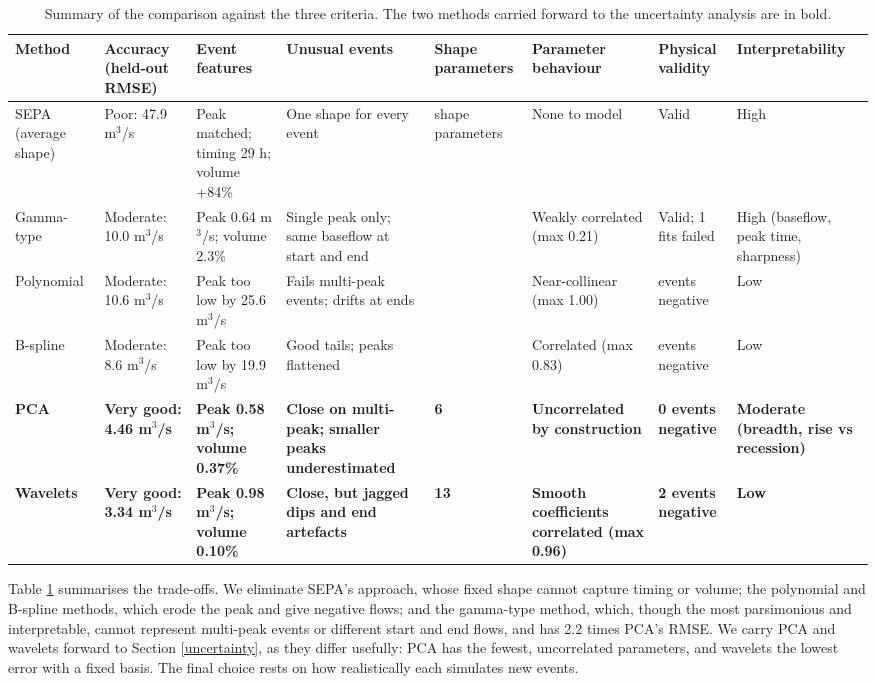 \documentclass[
  11pt,
  a4paper]{article}
\begin{document}
\begin{table}[!h]
\centering
\caption{\label{tab:cmp-synthesis}Summary of the comparison against the three criteria. The two methods carried forward to the uncertainty analysis are in bold.}
\centering
\fontsize{8}{10}\selectfont
\begin{tabular}[t]{>{\raggedright\arraybackslash}p{1.6cm}>{\raggedright\arraybackslash}p{1.5cm}>{\raggedright\arraybackslash}p{1.5cm}>{\raggedright\arraybackslash}p{1.5cm}>{\raggedright\arraybackslash}p{1.5cm}>{\raggedright\arraybackslash}p{1.5cm}>{\raggedright\arraybackslash}p{1.5cm}>{\raggedright\arraybackslash}p{1.5cm}}
\toprule
Method & Accuracy (held-out RMSE) & Event features & Unusual events & Shape parameters & Parameter behaviour & Physical validity & Interpretability\\
\midrule
SEPA (average shape) & Poor: 47.9 m$^3$/s & Peak matched; timing 29 h; volume +84\% & One shape for every event & 0 shape parameters & None to model & Valid & High\\
Gamma-type & Moderate: 10.0 m$^3$/s & Peak 0.64 m$^3$/s; volume 2.3\% & Single peak only; same baseflow at start and end & 3 & Weakly correlated (max 0.21) & Valid; 1 fits failed & High (baseflow, peak time, sharpness)\\
Polynomial & Moderate: 10.6 m$^3$/s & Peak too low by 25.6 m$^3$/s & Fails multi-peak events; drifts at ends & 8 & Near-collinear (max 1.00) & 15 events negative & Low\\
B-spline & Moderate: 8.6 m$^3$/s & Peak too low by 19.9 m$^3$/s & Good tails; peaks flattened & 9 & Correlated (max 0.83) & 15 events negative & Low\\
\textbf{PCA} & \textbf{Very good: 4.46 m$^3$/s} & \textbf{Peak 0.58 m$^3$/s; volume 0.37\%} & \textbf{Close on multi-peak; smaller peaks underestimated} & \textbf{6} & \textbf{Uncorrelated by construction} & \textbf{0 events negative} & \textbf{Moderate (breadth, rise vs recession)}\\
\addlinespace
\textbf{Wavelets} & \textbf{Very good: 3.34 m$^3$/s} & \textbf{Peak 0.98 m$^3$/s; volume 0.10\%} & \textbf{Close, but jagged dips and end artefacts} & \textbf{13} & \textbf{Smooth coefficients correlated (max 0.96)} & \textbf{2 events negative} & \textbf{Low}\\
\bottomrule
\end{tabular}
\end{table}

Table \ref{tab:cmp-synthesis} summarises the trade-offs. We eliminate SEPA's approach, whose fixed shape cannot capture timing or volume; the polynomial and B-spline methods, which erode the peak and give negative flows; and the gamma-type method, which, though the most parsimonious and interpretable, cannot represent multi-peak events or different start and end flows, and has 2.2 times PCA's RMSE. We carry PCA and wavelets forward to Section \ref{uncertainty}, as they differ usefully: PCA has the fewest, uncorrelated parameters, and wavelets the lowest error with a fixed basis. The final choice rests on how realistically each simulates new events.
\end{document}
